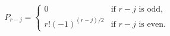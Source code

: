 \begin{equation}
P_{r-j}=\begin{cases}
0& \text{if $r-j$ is odd},\\
r! (-1)^{(r-j)/2}& \text{if $r-j$ is even}.
\end{cases}
\end{equation}